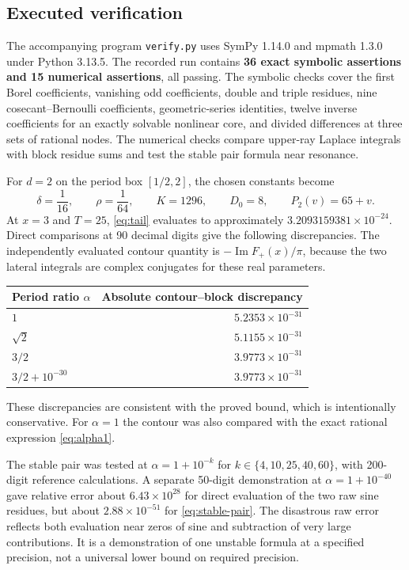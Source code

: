 \documentclass[11pt,a4paper]{article}
\numberwithin{equation}{section}
\theoremstyle{definition}
\theoremstyle{remark}
\newcommand{\im}{\operatorname{Im}}
\begin{document}
\subsection{Executed verification}
The accompanying program \texttt{verify.py} uses SymPy 1.14.0 and mpmath
1.3.0 under Python 3.13.5. The recorded run contains \textbf{36 exact
symbolic assertions and 15 numerical assertions}, all passing. The
symbolic checks cover the first Borel coefficients, vanishing odd
coefficients, double and triple residues, nine cosecant--Bernoulli
coefficients, geometric-series identities, twelve inverse coefficients
for an exactly solvable nonlinear core, and divided differences at three
sets of rational nodes. The numerical checks compare upper-ray Laplace
integrals with block residue sums and test the stable pair formula near
resonance.

For $d=2$ on the period box $[1/2,2]$, the chosen constants become
\begin{equation}
 \delta=\frac1{16},\qquad\rho=\frac1{64},\qquad
 K=1296,\qquad D_0=8,\qquad P_2(v)=65+v.
 \label{eq:testconstants}
\end{equation}
At $x=3$ and $T=25$, \eqref{eq:tail} evaluates to approximately
$3.2093159381\times10^{-24}$. Direct comparisons at 90 decimal digits
give the following discrepancies. The independently evaluated contour
quantity is $-\im F_+(x)/\pi$, because the two lateral integrals are
complex conjugates for these real parameters.
\begin{center}
\begin{tabular}{l r}
\toprule
Period ratio $\alpha$ & Absolute contour--block discrepancy\\
\midrule
$1$ & $5.2353\times10^{-31}$\\
$\sqrt2$ & $5.1155\times10^{-31}$\\
$3/2$ & $3.9773\times10^{-31}$\\
$3/2+10^{-30}$ & $3.9773\times10^{-31}$\\
\bottomrule
\end{tabular}
\end{center}
These discrepancies are consistent with the proved bound, which is
intentionally conservative. For $\alpha=1$ the contour was also compared
with the exact rational expression \eqref{eq:alpha1}.

The stable pair was tested at $\alpha=1+10^{-k}$ for
$k\in\{4,10,25,40,60\}$, with 200-digit reference calculations.
A separate 50-digit demonstration at $\alpha=1+10^{-40}$ gave relative
error about $6.43\times10^{28}$ for direct evaluation of the two raw sine
residues, but about $2.88\times10^{-51}$ for \eqref{eq:stable-pair}.
The disastrous raw error reflects both evaluation near zeros of sine and
subtraction of very large contributions. It is a demonstration of one
unstable formula at a specified precision, not a universal lower bound
on required precision.
\end{document}
